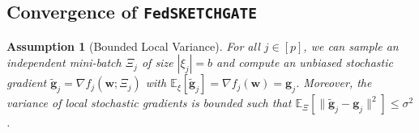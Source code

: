 \documentclass[twoside]{article}
\newtheorem{assumption}{Assumption}
\begin{document}
\vspace{-0.05in}
\subsection{Convergence of  \texttt{FedSKETCHGATE}} 
\vspace{-0.05in}


\begin{assumption}[Bounded Local Variance]\label{Assu:2}
For all $j\in [p]$, we can sample an independent mini-batch $\Xi_j$ of size $|{\xi}_j| = b$ and compute an unbiased stochastic gradient $\tilde{\mathbf{g}}_j = \nabla f_j(\boldsymbol{w}; \Xi_j)$ with $\mathbb{E}_{\xi}[\tilde{\mathbf{g}}_j] = \nabla f_{j}(\boldsymbol{w})={\mathbf{g}}_j$. 
Moreover, the variance of local stochastic gradients is bounded such that $
\mathbb{E}_{\Xi}\left[\|\tilde{\mathbf{g}}_j-{\mathbf{g}}_j\|^2\right]\leq \sigma^2$.
\end{assumption}
\end{document}
